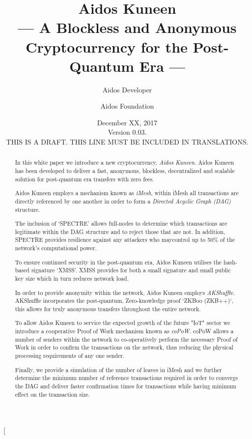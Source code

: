 \documentclass[a4paper,10pt,twocolumn]{article}
\title{Aidos Kuneen \\ --- A Blockless and Anonymous Cryptocurrency for the Post-Quantum Era ---}
\author{
	Aidos Developer \and Aidos Foundation
}
\date{December XX, 2017 \\ Version 0.03.\\ THIS IS A DRAFT. THIS LINE MUST BE INCLUDED IN TRANSLATIONS.}
\begin{document}
\twocolumn[
	\maketitle

\begin{abstract}
		In this white paper we introduce a new cryptocurrency, \emph{Aidos Kuneen}. Aidos Kuneen has been developed to deliver a 
		fast, anonymous, blockless, decentralized and scalable solution for post-quantum era transfers with zero fees. 
		
		Aidos Kuneen employs a mechanism known as \emph{iMesh}, within iMesh all transactions are directly referenced by
		one another in order to form a \emph{Directed Acyclic Graph (DAG)} structure.
		
		The inclusion of `SPECTRE' allows full-nodes to determine which transactions are legitimate within the DAG structure and
		to reject those that are not. In addition, SPECTRE provides resilience against any attackers who maycontrol up to 50\% 
		of the network's computational power.
		
		To ensure continued security in the post-quantum era, Aidos Kuneen utilises the hash-based signature `XMSS'. XMSS
		provides for both a small signature and small public key size which in turn reduces network load.
	
		In order to provide anonymity within the network, Aidos Kuneen employs \emph{AKShuffle}. AKShuffle 	
		incorporates the post-quantum, Zero-knowledge proof `ZKBoo (ZKB++)`, this allows for truly anonymous transfers 
		throughout the entire network.
		
		To allow Aidos Kuneen to service the expected growth of the future "IoT" sector we introduce a cooperative Proof of Work
		mechanism known as \emph{coPoW}. coPoW allows a number of senders within the network to co-operatively perform the 
		necessary Proof of Work in order to confirm the transactions on the network, thus reducing the physical processing 
		requirements of any one sender.
		
		Finally, we provide a simulation of the number of leaves in iMesh and we further determine the minimum number of 
		reference transactions required in order to converge the DAG and deliver faster confirmation times for transactions 
		while having minimum effect on the transaction size.
		
		\end{abstract}

		\vspace{5cm}
\end{document}
